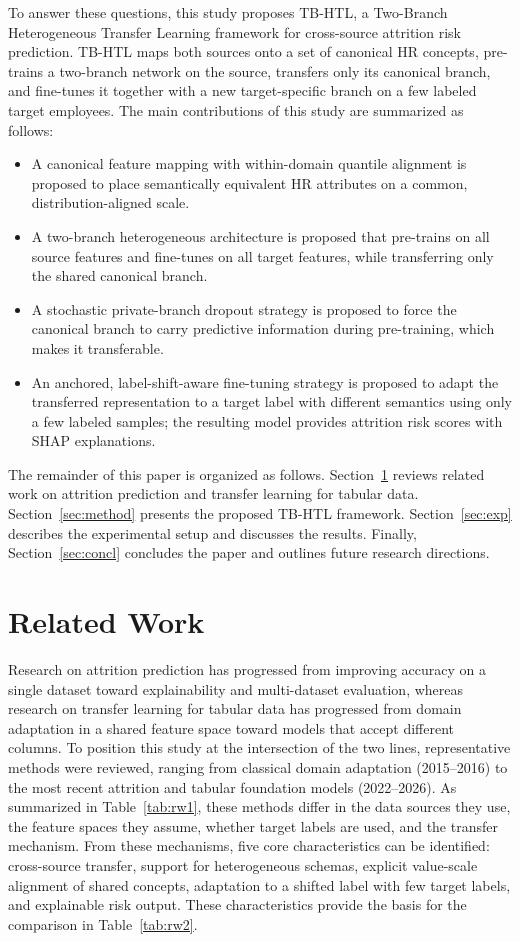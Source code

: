 \documentclass[runningheads]{llncs}
\begin{document}
To answer these questions, this study proposes TB-HTL, a Two-Branch Heterogeneous Transfer Learning framework for cross-source attrition risk prediction. TB-HTL maps both sources onto a set of canonical HR concepts, pre-trains a two-branch network on the source, transfers only its canonical branch, and fine-tunes it together with a new target-specific branch on a few labeled target employees. The main contributions of this study are summarized as follows:
\begin{itemize}
\item A canonical feature mapping with within-domain quantile alignment is proposed to place semantically equivalent HR attributes on a common, distribution-aligned scale.
\item A two-branch heterogeneous architecture is proposed that pre-trains on all source features and fine-tunes on all target features, while transferring only the shared canonical branch.
\item A stochastic private-branch dropout strategy is proposed to force the canonical branch to carry predictive information during pre-training, which makes it transferable.
\item An anchored, label-shift-aware fine-tuning strategy is proposed to adapt the transferred representation to a target label with different semantics using only a few labeled samples; the resulting model provides attrition risk scores with SHAP explanations.
\end{itemize}

The remainder of this paper is organized as follows. Section~\ref{sec:related} reviews related work on attrition prediction and transfer learning for tabular data. Section~\ref{sec:method} presents the proposed TB-HTL framework. Section~\ref{sec:exp} describes the experimental setup and discusses the results. Finally, Section~\ref{sec:concl} concludes the paper and outlines future research directions.

\section{Related Work}\label{sec:related}
Research on attrition prediction has progressed from improving accuracy on a single dataset toward explainability and multi-dataset evaluation, whereas research on transfer learning for tabular data has progressed from domain adaptation in a shared feature space toward models that accept different columns. To position this study at the intersection of the two lines, representative methods were reviewed, ranging from classical domain adaptation (2015--2016) to the most recent attrition and tabular foundation models (2022--2026). As summarized in Table~\ref{tab:rw1}, these methods differ in the data sources they use, the feature spaces they assume, whether target labels are used, and the transfer mechanism. From these mechanisms, five core characteristics can be identified: cross-source transfer, support for heterogeneous schemas, explicit value-scale alignment of shared concepts, adaptation to a shifted label with few target labels, and explainable risk output. These characteristics provide the basis for the comparison in Table~\ref{tab:rw2}.
\end{document}
